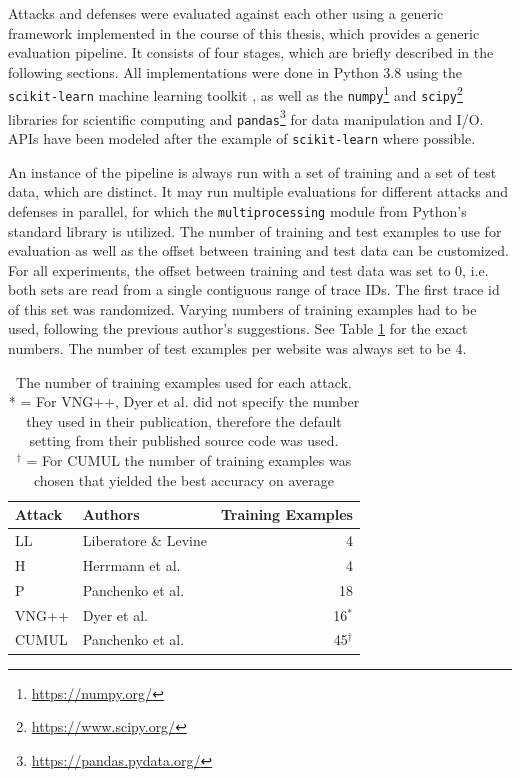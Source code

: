 \documentclass[
	ruledheaders=chapter,
	class=report,
	thesis={type=master, department=inf},
	accentcolor=1c,
	custommargins=true,
	marginpar=false,
	parskip=half-,
	fontsize=11pt,
]{tudapub}
\begin{document}
	Attacks and defenses were evaluated against each other using a generic framework implemented in the course of this thesis, which provides a generic evaluation pipeline. It consists of four stages, which are briefly described in the following sections. All implementations were done in Python 3.8 using the \texttt{scikit-learn} machine learning toolkit \cite{Pedregosa2011}, as well as the \texttt{numpy}\footnote{\url{https://numpy.org/}} \cite{Harris2020} and \texttt{scipy}\footnote{\url{https://www.scipy.org/}} \cite{Virtanen2020} libraries for scientific computing and \texttt{pandas}\footnote{\url{https://pandas.pydata.org/}} \cite{McKinney2010,Reback2021} for data manipulation and I/O. APIs have been modeled after the example of \texttt{scikit-learn} \cite{Buitinck2013} where possible.
	
	An instance of the pipeline is always run with a set of training and a set of test data, which are distinct. It may run multiple evaluations for different attacks and defenses in parallel, for which the \texttt{multiprocessing} module from Python's standard library is utilized. The number of training and test examples to use for evaluation as well as the offset between training and test data can be customized. For all experiments, the offset between training and test data was set to 0, i.e. both sets are read from a single contiguous range of trace IDs. The first trace id of this set was randomized. Varying numbers of training examples had to be used, following the previous author's suggestions. See Table \ref{tbl:train} for the exact numbers. The number of test examples per website was always set to be 4.
	
	\begin{table}
		\centering
		\begin{tabularx}{0.85\textwidth}{lXr}
			\toprule \textbf{Attack} & \textbf{Authors} & \textbf{Training Examples} \\
			\midrule LL & Liberatore \& Levine \cite{Liberatore2006} & 4 \\
			H & Herrmann et al. \cite{Herrmann2009} & 4 \\
			P & Panchenko et al. \cite{Panchenko2011} & 18\\
			VNG++ & Dyer et al. \cite{Dyer2012} & 16${}^*$\\
			CUMUL & Panchenko et al. \cite{Panchenko2016} & 45${}^\dagger$\\
			\bottomrule
		\end{tabularx}
		\caption[The number of training examples used for each attack]{The number of training examples used for each attack.\\{*} = For VNG++, Dyer et al. did not specify the number they used in their publication, therefore the default setting from their published source code was used.\\{${}^\dagger$} = For CUMUL the number of training examples was chosen that yielded the best accuracy on average}
		\label{tbl:train}
	\end{table}
	
\end{document}
